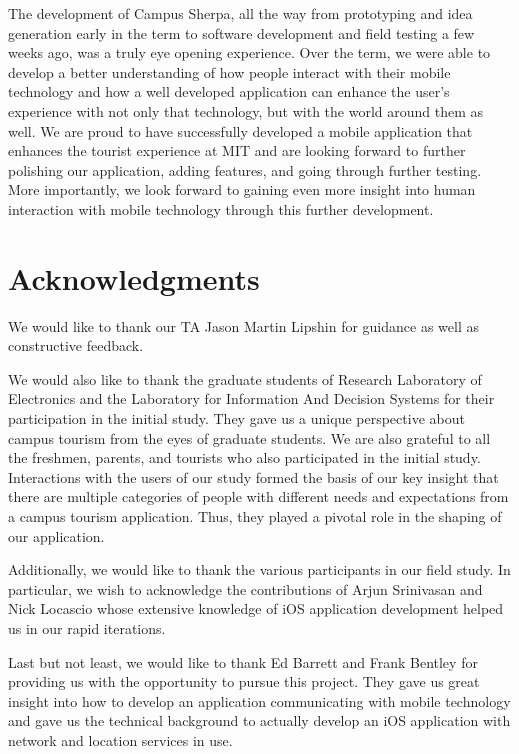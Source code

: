 \documentclass{sigchi}
\begin{document}
The development of Campus Sherpa, all the way from prototyping and idea generation early in the term to software development and field testing a few weeks ago, was a truly eye opening experience. Over the term, we were able to develop a better understanding of how people interact with their mobile technology and how a well developed application can enhance the user's experience with not only that technology, but with the world around them as well. We are proud to have successfully developed a mobile application that enhances the tourist experience at MIT and are looking forward to further polishing our application, adding features, and going through further testing. More importantly, we look forward to gaining even more insight into human interaction with mobile technology through this further development. 



\section{Acknowledgments}

We would like to thank our TA Jason Martin Lipshin for guidance as well as constructive feedback. 

We would also like to thank the graduate students of Research Laboratory of Electronics and the Laboratory for Information And Decision Systems for their participation in the initial study. They gave us a unique perspective about campus tourism from the eyes of graduate students. We are also grateful to all the freshmen, parents, and tourists who also participated in the initial study. Interactions with the users of our study formed the basis of our key insight that there are multiple categories of people with different needs and expectations from a campus tourism application. Thus, they played a pivotal role in the shaping of our application. 

Additionally, we would like to thank the various participants in our field study. In particular, we wish to acknowledge the contributions of Arjun Srinivasan and Nick Locascio whose extensive knowledge of iOS application development helped us in our rapid iterations. 

Last but not least, we would like to thank Ed Barrett and Frank Bentley for providing us with the opportunity to pursue this project. They gave us great insight into how to develop an
application communicating with mobile technology and gave us the technical background to actually develop an iOS application with network and location services in use. 
\end{document}
